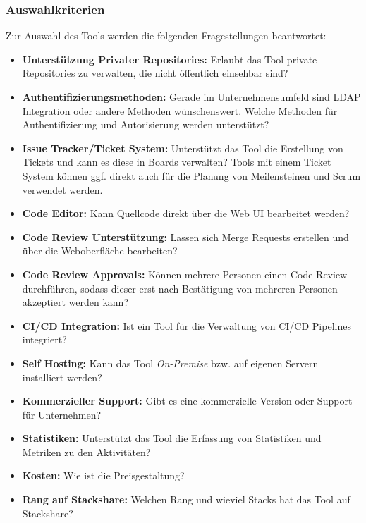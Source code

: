 \newpage
\subsubsection{Auswahlkriterien}\label{collaboration_vcs_kriterien}

Zur Auswahl des Tools werden die folgenden Fragestellungen beantwortet:

\begin{itemize}
    \item \textbf{Unterstützung Privater Repositories:}
    Erlaubt das Tool private Repositories zu verwalten, die nicht öffentlich einsehbar sind?

    \item \textbf{Authentifizierungsmethoden:}
    Gerade im Unternehmensumfeld sind LDAP Integration oder andere Methoden wünschenswert.
    Welche Methoden für Authentifizierung und Autorisierung werden unterstützt?

    \item \textbf{Issue Tracker/Ticket System:}
    Unterstützt das Tool die Erstellung von Tickets und kann es diese in Boards verwalten?
    Tools mit einem Ticket System können ggf. direkt auch für die Planung von Meilensteinen und Scrum verwendet werden.

    \item \textbf{Code Editor:}
    Kann Quellcode direkt über die Web UI bearbeitet werden?

    \item \textbf{Code Review Unterstützung:}
    Lassen sich Merge Requests erstellen und über die Weboberfläche bearbeiten?
    
    \item \textbf{Code Review Approvals:}
    Können mehrere Personen einen Code Review durchführen, sodass dieser erst nach Bestätigung von mehreren Personen akzeptiert werden kann?

    \item \textbf{CI/CD Integration:}
    Ist ein Tool für die Verwaltung von CI/CD Pipelines integriert?

    \item \textbf{Self Hosting:}
    Kann das Tool \textsl{On-Premise} bzw. auf eigenen Servern installiert werden?

    \item \textbf{Kommerzieller Support:}
    Gibt es eine kommerzielle Version oder Support für Unternehmen?

    \item \textbf{Statistiken:}
    Unterstützt das Tool die Erfassung von Statistiken und Metriken zu den Aktivitäten?

    \item \textbf{Kosten:}
    Wie ist die Preisgestaltung?

    \item \textbf{Rang auf Stackshare:}
    Welchen Rang und wieviel Stacks hat das Tool auf Stackshare?
\end{itemize}